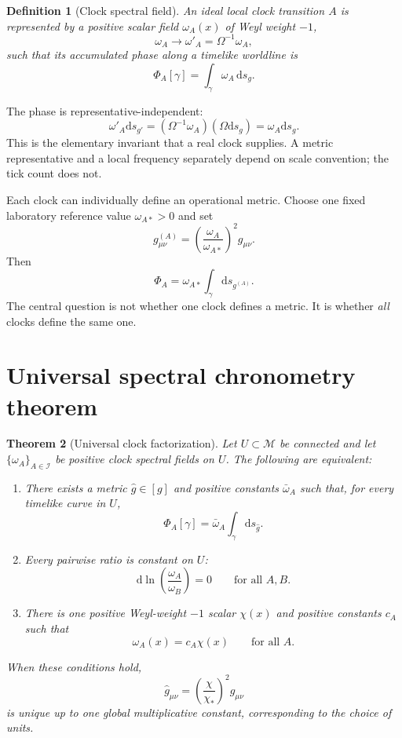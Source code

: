 \documentclass[11pt,a4paper]{article}
\newtheorem{definition}{Definition}[section]
\newtheorem{theorem}[definition]{Theorem}
\newcommand{\dd}{\mathrm{d}}
\newcommand{\M}{\mathcal{M}}
\begin{document}
\begin{definition}[Clock spectral field]
An ideal local clock transition $A$ is represented by a positive scalar field $\omega_A(x)$ of Weyl weight $-1$,
\[
 \omega_A\longrightarrow\omega'_A=\Omega^{-1}\omega_A,
\]
such that its accumulated phase along a timelike worldline is
\[
 \Phi_A[\gamma]=\int_\gamma \omega_A\,\dd s_g.
\]
\end{definition}

The phase is representative-independent:
\[
 \omega'_A\dd s_{g'}=(\Omega^{-1}\omega_A)(\Omega\dd s_g)=\omega_A\dd s_g.
\]
This is the elementary invariant that a real clock supplies. A metric representative and a local frequency separately depend on scale convention; the tick count does not.

Each clock can individually define an operational metric. Choose one fixed laboratory reference value $\omega_{A*}>0$ and set
\[
 g^{(A)}_{\mu\nu}=\left(\frac{\omega_A}{\omega_{A*}}\right)^2g_{\mu\nu}.
\]
Then
\[
 \Phi_A=\omega_{A*}\int_\gamma\dd s_{g^{(A)}}.
\]
The central question is not whether one clock defines a metric. It is whether \emph{all} clocks define the same one.

\section{Universal spectral chronometry theorem}

\begin{theorem}[Universal clock factorization]
Let $U\subset\M$ be connected and let $\{\omega_A\}_{A\in\mathcal I}$ be positive clock spectral fields on $U$. The following are equivalent:

\begin{enumerate}[label=(\roman*)]
  \item There exists a metric $\widehat g\in[g]$ and positive constants $\bar\omega_A$ such that, for every timelike curve in $U$,
  \[
    \Phi_A[\gamma]=\bar\omega_A\int_\gamma\dd s_{\widehat g}.
  \]
  \item Every pairwise ratio is constant on $U$:
  \[
    \dd\ln\!\left(\frac{\omega_A}{\omega_B}\right)=0
    \qquad\text{for all }A,B.
  \]
  \item There is one positive Weyl-weight $-1$ scalar $\chi(x)$ and positive constants $c_A$ such that
  \[
    \omega_A(x)=c_A\chi(x)
    \qquad\text{for all }A.
  \]
\end{enumerate}

When these conditions hold,
\[
 \widehat g_{\mu\nu}=\left(\frac{\chi}{\chi_*}\right)^2g_{\mu\nu}
\]
is unique up to one global multiplicative constant, corresponding to the choice of units.
\end{theorem}
\end{document}
